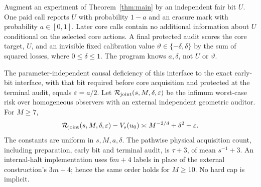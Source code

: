 \begin{theorem}\label{thm:joint}
Augment an experiment of Theorem~\ref{thm:main} by an independent fair bit $U$. One paid call reports $U$ with probability $1-a$ and an erasure mark with probability $a\in[0,1]$. Later core calls contain no additional information about $U$ conditional on the selected core actions. A final protected audit scores the core target, $U$, and an invisible fixed calibration value $\vartheta\in\{-\delta,\delta\}$ by the sum of squared losses, where $0\le\delta\le1$. The program knows $a,\delta$, not $U$ or $\vartheta$.

The parameter-independent causal deficiency of this interface to the exact early-bit interface, with that bit required before core acquisition and protected at the terminal audit, equals $\varepsilon=a/2$. Let $\mathcal R_{\rm joint}(s,M,\delta,\varepsilon)$ be the infimum worst-case risk over homogeneous observers with an external independent geometric auditor. For $M\ge7$,
\begin{equation}\label{eq:joint}
 \mathcal R_{\rm joint}(s,M,\delta,\varepsilon)-V_s(u_0)
 \asymp M^{-2/d}+\delta^2+\varepsilon.
\end{equation}
The constants are uniform in $s,M,a,\delta$. The pathwise physical acquisition count, including preparation, early bit and terminal audit, is $\tau+3$, of mean $s^{-1}+3$. An internal-halt implementation uses $6m+4$ labels in place of the external construction's $3m+4$; hence the same order holds for $M\ge10$. No hard cap is implicit.
\end{theorem}
